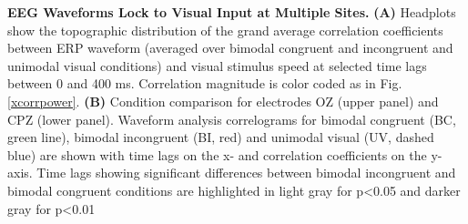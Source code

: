 \textbf{EEG Waveforms Lock to Visual Input at Multiple Sites.} \textbf{(A)} Headplots show the
topographic distribution of the grand average correlation coefficients
between ERP waveform (averaged over bimodal congruent and incongruent and
unimodal visual conditions) and visual stimulus speed at selected time lags
between 0 and 400 ms. Correlation magnitude is color coded as in Fig.
\ref{xcorrpower}. \textbf{(B)} Condition comparison for electrodes OZ
(upper panel) and CPZ (lower panel). Waveform analysis correlograms for
bimodal congruent (BC, green line), bimodal incongruent (BI, red) and
unimodal visual (UV, dashed blue) are shown with time lags on the x- and
correlation coefficients on the y-axis. Time lags showing significant
differences between bimodal incongruent and bimodal congruent conditions
are highlighted in light gray for p\textless0.05 and darker gray for
p\textless0.01
